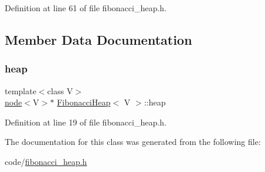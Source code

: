 Definition at line 61 of file fibonacci\+\_\+heap.\+h.



\subsection{Member Data Documentation}
\mbox{\label{class_fibonacci_heap_a13c58cd79d84a4398fb9fb1c956ccfc5}} 
\subsubsection{\texorpdfstring{heap}{heap}}
{\footnotesize\ttfamily template$<$class V$>$ \\
\hyperlink{structnode}{node}$<$V$>$$\ast$ \hyperlink{class_fibonacci_heap}{Fibonacci\+Heap}$<$ V $>$\+::heap}



Definition at line 19 of file fibonacci\+\_\+heap.\+h.



The documentation for this class was generated from the following file\+:\begin{DoxyCompactItemize}
\item 
code/\hyperlink{fibonacci__heap_8h}{fibonacci\+\_\+heap.\+h}\end{DoxyCompactItemize}

